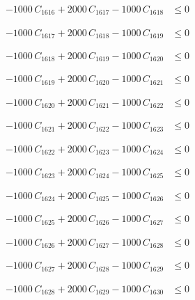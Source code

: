 \documentclass[a4paper,11pt]{article}
\begin{document}
\begin{align}
-1000\,C_{1616} + 2000\,C_{1617} - 1000\,C_{1618} &\leq 0 \nonumber
\end{align}

\begin{align}
-1000\,C_{1617} + 2000\,C_{1618} - 1000\,C_{1619} &\leq 0 \nonumber
\end{align}

\begin{align}
-1000\,C_{1618} + 2000\,C_{1619} - 1000\,C_{1620} &\leq 0 \nonumber
\end{align}

\begin{align}
-1000\,C_{1619} + 2000\,C_{1620} - 1000\,C_{1621} &\leq 0 \nonumber
\end{align}

\begin{align}
-1000\,C_{1620} + 2000\,C_{1621} - 1000\,C_{1622} &\leq 0 \nonumber
\end{align}

\begin{align}
-1000\,C_{1621} + 2000\,C_{1622} - 1000\,C_{1623} &\leq 0 \nonumber
\end{align}

\begin{align}
-1000\,C_{1622} + 2000\,C_{1623} - 1000\,C_{1624} &\leq 0 \nonumber
\end{align}

\begin{align}
-1000\,C_{1623} + 2000\,C_{1624} - 1000\,C_{1625} &\leq 0 \nonumber
\end{align}

\begin{align}
-1000\,C_{1624} + 2000\,C_{1625} - 1000\,C_{1626} &\leq 0 \nonumber
\end{align}

\begin{align}
-1000\,C_{1625} + 2000\,C_{1626} - 1000\,C_{1627} &\leq 0 \nonumber
\end{align}

\begin{align}
-1000\,C_{1626} + 2000\,C_{1627} - 1000\,C_{1628} &\leq 0 \nonumber
\end{align}

\begin{align}
-1000\,C_{1627} + 2000\,C_{1628} - 1000\,C_{1629} &\leq 0 \nonumber
\end{align}

\begin{align}
-1000\,C_{1628} + 2000\,C_{1629} - 1000\,C_{1630} &\leq 0 \nonumber
\end{align}
\end{document}
